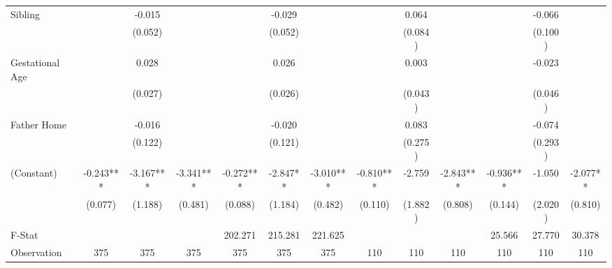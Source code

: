 \begin{tabular}{lcccccccccccc}
Sibling &  & -0.015 &  &  & -0.029 &  &  & 0.064 &  &  & -0.066 &  \\
 &  & (0.052) &  &  & (0.052) &  &  & (0.084) &  &  & (0.100) &  \\
Gestational Age &  & 0.028 &  &  & 0.026 &  &  & 0.003 &  &  & -0.023 &  \\
 &  & (0.027) &  &  & (0.026) &  &  & (0.043) &  &  & (0.046) &  \\
Father Home &  & -0.016 &  &  & -0.020 &  &  & 0.083 &  &  & -0.074 &  \\
 &  & (0.122) &  &  & (0.121) &  &  & (0.275) &  &  & (0.293) &  \\
(Constant) & -0.243*** & -3.167*** & -3.341*** & -0.272*** & -2.847** & -3.010*** & -0.810*** & -2.759 & -2.843*** & -0.936*** & -1.050 & -2.077** \\
 & (0.077) & (1.188) & (0.481) & (0.088) & (1.184) & (0.482) & (0.110) & (1.882) & (0.808) & (0.144) & (2.020) & (0.810) \\
\midrule 
F-Stat &  &  &  & 202.271 & 215.281 & 221.625 &  &  &  & 25.566 & 27.770 & 30.378 \\
Observation & 375 & 375 & 375 & 375 & 375 & 375 & 110 & 110 & 110 & 110 & 110 & 110 \\
\midrule 
\bottomrule 
\end{tabular}
